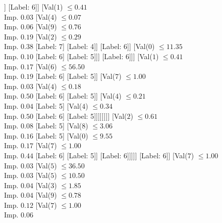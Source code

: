 \documentclass[margin=10pt]{standalone}
\begin{document}
\begin{forest}
										[Val($2$) $ \leq 0.07$ \\ Imp. $0.04$
											[Val($7$) $ \leq 1.00$ \\ Imp. $0.12$
												[Val($5$) $ \leq 8.50$ \\ Imp. $0.09$
													[Label: 5]
													[Label: 6]]
												[Label: 6]]
											[Val($1$) $ \leq 0.41$ \\ Imp. $0.03$
												[Val($4$) $ \leq 0.07$ \\ Imp. $0.06$
													[Val($9$) $ \leq 0.76$ \\ Imp. $0.19$
														[Val($2$) $ \leq 0.29$ \\ Imp. $0.38$
															[Label: 7]
															[Label: 4]]
														[Label: 6]]
													[Val($0$) $ \leq 11.35$ \\ Imp. $0.10$
														[Label: 6]
														[Label: 5]]]
												[Label: 6]]]
										[Val($1$) $ \leq 0.41$ \\ Imp. $0.17$
											[Val($6$) $ \leq 56.50$ \\ Imp. $0.19$
												[Label: 6]
												[Label: 5]]
											[Val($7$) $ \leq 1.00$ \\ Imp. $0.03$
												[Val($4$) $ \leq 0.18$ \\ Imp. $0.50$
													[Label: 6]
													[Label: 5]]
												[Val($4$) $ \leq 0.21$ \\ Imp. $0.04$
													[Label: 5]
													[Val($4$) $ \leq 0.34$ \\ Imp. $0.50$
														[Label: 6]
														[Label: 5]]]]]]]]
							[Val($2$) $ \leq 0.61$ \\ Imp. $0.08$
								[Label: 5]
								[Val($8$) $ \leq 3.06$ \\ Imp. $0.16$
									[Label: 5]
									[Val($0$) $ \leq 9.55$ \\ Imp. $0.17$
										[Val($7$) $ \leq 1.00$ \\ Imp. $0.44$
											[Label: 6]
											[Label: 5]]
										[Label: 6]]]]]
						[Label: 6]]
					[Val($7$) $ \leq 1.00$ \\ Imp. $0.03$
						[Val($5$) $ \leq 36.50$ \\ Imp. $0.03$
							[Val($5$) $ \leq 10.50$ \\ Imp. $0.04$
								[Val($3$) $ \leq 1.85$ \\ Imp. $0.04$
									[Val($9$) $ \leq 0.78$ \\ Imp. $0.12$
										[Val($7$) $ \leq 1.00$ \\ Imp. $0.06$

\end{forest}
\end{document}
